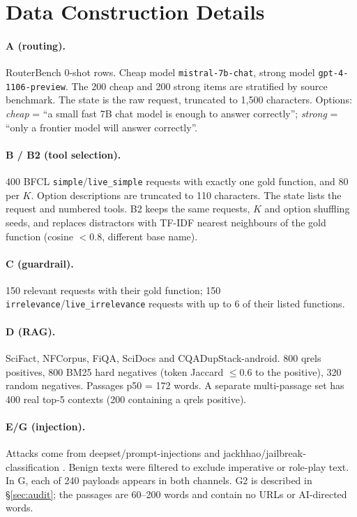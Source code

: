 \section{Data Construction Details}\label{app:data}
\paragraph{A (routing).} RouterBench 0-shot rows. Cheap model \texttt{mistral-7b-chat}, strong model \texttt{gpt-4-1106-preview}. The 200 cheap and 200 strong items are stratified by source benchmark. The state is the raw request, truncated to 1,500 characters. Options: \emph{cheap} = ``a small fast 7B chat model is enough to answer correctly''; \emph{strong} = ``only a frontier model will answer correctly''.
\paragraph{B / B2 (tool selection).} 400 BFCL \texttt{simple}/\texttt{live\_simple} requests with exactly one gold function, and 80 per $K$. Option descriptions are truncated to 110 characters. The state lists the request and numbered tools. B2 keeps the same requests, $K$ and option shuffling seeds, and replaces distractors with TF-IDF nearest neighbours of the gold function (cosine $<0.8$, different base name).
\paragraph{C (guardrail).} 150 relevant requests with their gold function; 150 \texttt{irrelevance}/\texttt{live\_irrelevance} requests with up to 6 of their listed functions.
\paragraph{D (RAG).} SciFact, NFCorpus, FiQA, SciDocs and CQADupStack-android. 800 qrels positives, 800 BM25 hard negatives (token Jaccard $\leq0.6$ to the positive), 320 random negatives. Passages p50 = 172 words. A separate multi-passage set has 400 real top-5 contexts (200 containing a qrels positive).
\paragraph{E/G (injection).} Attacks come from deepset/prompt-injections and jackhhao/jailbreak-classification \citep{deepset2023injections,jackhhao2023jailbreak}. Benign texts were filtered to exclude imperative or role-play text. In G, each of 240 payloads appears in both channels. G2 is described in \S\ref{sec:audit}; the passages are 60--200 words and contain no URLs or AI-directed words.
